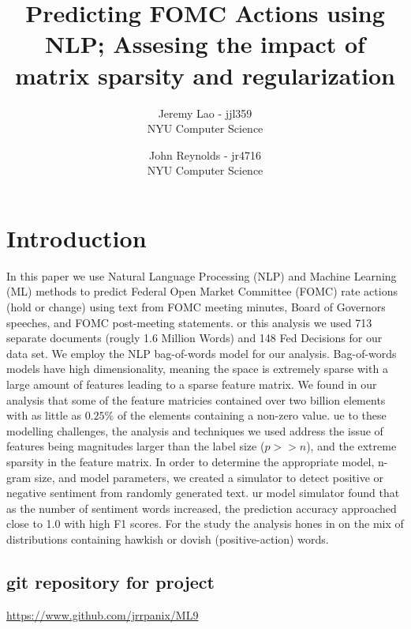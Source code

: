 \documentclass[11pt]{article}
\title{Predicting FOMC Actions using NLP; Assesing the impact of matrix sparsity and regularization}
\author{
        Jeremy Lao - jjl359 \\
        NYU Computer Science \\
            \and
        John Reynolds - jr4716 \\
        NYU Computer Science \\
}
\newcommand{\vertSpace}[1]{\vspace{3mm}}
\begin{document}
{\setlength{\mathindent}{0cm}
\maketitle


\section{Introduction}
In this paper we use Natural Language Processing (NLP) and Machine Learning (ML) methods to predict Federal Open Market Committee (FOMC) rate actions (hold or change) using text from FOMC meeting minutes, Board of Governors speeches, and FOMC post-meeting statements.  \vertSpace

 
For this analysis we used 713 separate documents (rougly 1.6 Million Words) and 148 Fed Decisions for our data set.  We employ the NLP bag-of-words model for our analysis.  Bag-of-words models have high dimensionality, meaning the space is extremely sparse with a large amount of features leading to a sparse feature matrix.  We found in our analysis that some of the feature matricies contained over two billion elements with as little as $0.25\%$ of the elements containing a non-zero value.  \vertSpace


Due to these modelling challenges, the analysis and techniques we used address the issue of features being magnitudes larger than the label size ($p>>n$), and the extreme sparsity in the feature matrix.  In order to determine the appropriate model, n-gram size, and model parameters, we created a simulator to detect positive or negative sentiment from randomly generated text.  \vertSpace 


Our model simulator found that as the number of sentiment words increased, the prediction accuracy approached close to 1.0 with high F1 scores.  For the study the analysis hones in on the mix of distributions containing hawkish or dovish (positive-action) words.


\subsection{git repository for project}
\url{https://www.github.com/jrrpanix/ML9}

}
\end{document}
